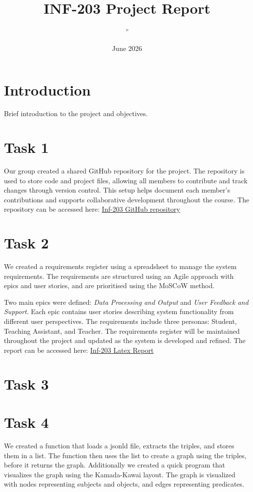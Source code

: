 \documentclass[a4paper,11pt]{article}
\title{INF-203 Project Report}
\author{''}
\date{June 2026}
\begin{document}
\maketitle

\tableofcontents
\newpage

\section{Introduction}
Brief introduction to the project and objectives.

\section{Task 1}
Our group created a shared GitHub repository for the project. The repository is used to store code and project files, allowing all members to contribute and track changes through version control. This setup helps document each member's contributions and supports collaborative development throughout the course.
The repository can be accessed here: \href{https://github.com/izzaqamar/Inf-203.git}{Inf-203 GitHub repository}
\section{Task 2}

We created a requirements register using a spreadsheet to manage the system requirements. The requirements are structured using an Agile approach with epics and user stories, and are prioritised using the MoSCoW method.

Two main epics were defined: \textit{Data Processing and Output} and \textit{User Feedback and Support}. Each epic contains user stories describing system functionality from different user perspectives. The requirements include three personas: Student, Teaching Assistant, and Teacher.
The requirements register will be maintained throughout the project and updated as the system is developed and refined.
The report can be accessed here: \href{https://docs.google.com/spreadsheets/d/187aslKKx-FqcoSc7nYzcPrt7RW5b8iT2UYNy3XJ90Yw/edit?usp=sharing}{Inf-203 Latex Report}
\section{Task 3}

\section{Task 4}
We created a function that loads a jsonld file, extracts the triples, and stores them in a list. The function then uses the list to create a graph using the triples, before it returns the graph.
Additionally we created a quick program that visualizes the graph using the Kamada-Kawai layout. The graph is visualized with nodes representing subjects and objects, and edges representing predicates. 
\end{document}
